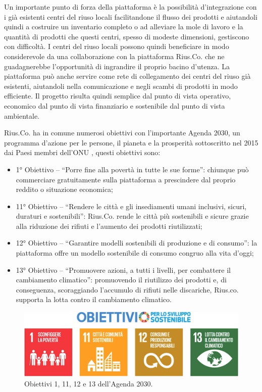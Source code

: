 Un importante punto di forza della piattaforma è la possibilità d'integrazione con i già esistenti centri del riuso locali facilitandone il flusso dei prodotti e aiutandoli quindi a costruire un inventario completo o ad alleviare la mole di lavoro e la quantità di prodotti che questi centri, spesso di modeste dimensioni, gestiscono con difficoltà. I centri del riuso locali possono quindi beneficiare in modo considerevole da una collaborazione con la piattaforma Rius.Co. che ne guadagnerebbe l'opportunità di ingrandire il proprio bacino d'utenza. 
La piattaforma può anche servire come rete di collegamento dei centri del riuso già esistenti, aiutandoli nella comunicazione e negli scambi di prodotti in modo efficiente. Il progetto risulta quindi semplice dal punto di vista operativo, economico dal punto di vista finanziario e sostenibile dal punto di vista ambientale. 
\medskip

Rius.Co. ha in comune numerosi obiettivi con l'importante Agenda 2030, un programma d'azione per le persone, il pianeta e la prosperità sottoscritto nel 2015 dai Paesi membri dell'ONU \cite{Agenda2030}, questi obiettivi sono: 
\begin{itemize}
    \item 1° Obiettivo – “Porre fine alla povertà in tutte le sue forme”: chiunque può commerciare gratuitamente sulla piattaforma a prescindere dal proprio reddito o situazione economica; 
    \item 11° Obiettivo – “Rendere le città e gli insediamenti umani inclusivi, sicuri, duraturi e sostenibili”: Rius.Co. rende le città più sostenibili e sicure grazie alla riduzione dei rifiuti e l'aumento dei prodotti riutilizzati; 
    \item 12° Obiettivo – “Garantire modelli sostenibili di produzione e di consumo”: la piattaforma offre un modello sostenibile di consumo congruo alla vita d'oggi; 
    \item 13° Obiettivo – “Promuovere azioni, a tutti i livelli, per combattere il cambiamento climatico”: promuovendo il riutilizzo dei prodotti e, di conseguenza, scoraggiando l'accumulo di rifiuti nelle discariche, Rius.co. supporta la lotta contro il cambiamento climatico. 
\end{itemize}
\begin{figure}[hb]
    \centering\includegraphics[scale=0.1]{images/agenda_2030.png}
    \caption{Obiettivi 1, 11, 12 e 13 dell'Agenda 2030.}
\end{figure}
\clearpage
